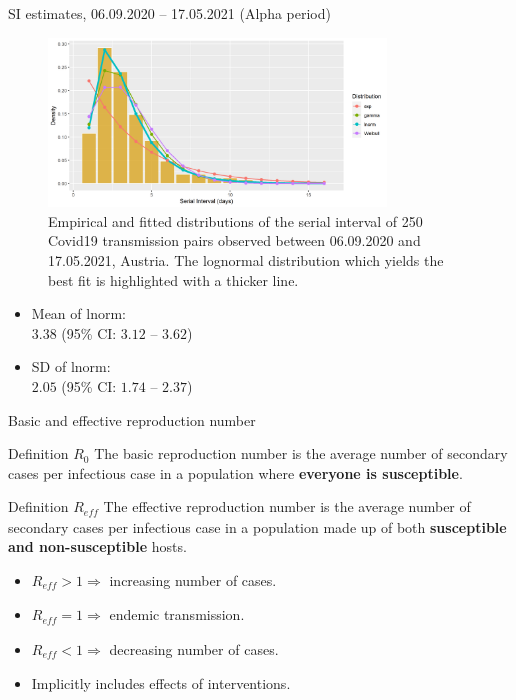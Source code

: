 \documentclass[
  ignorenonframetext,
  aspectratio=169,
]{beamer}
\newcommand{\mli}[1]{\mathit{#1}}%
\begin{document}
\begin{frame}{SI estimates, 06.09.2020 -- 17.05.2021 (Alpha period)}
\protect\hypertarget{si-estimates-06.09.2020-17.05.2021-alpha-period}{}
\begin{minipage} {.70\textwidth}
\begin{figure}
  \centering
  \includegraphics[width=0.8\textwidth,keepaspectratio]{img/fig2_fits_p2_2023-05-12.png}
  \caption{Empirical and fitted distributions of the serial interval of 250 Covid19 transmission pairs observed between 06.09.2020 and 17.05.2021, Austria. The lognormal  distribution which yields the best fit is highlighted with a thicker line.}
\end{figure}

\end{minipage}
\begin{minipage} {.25\textwidth}
\begin{itemize}
\item Mean of lnorm: \\ $3.38$ (95\% CI: $3.12$ -- $3.62$)
\item SD of lnorm: \\ $2.05$ (95\% CI: $1.74$ -- $2.37$)
\end{itemize}
\end{minipage}
\end{frame}

\begin{frame}{Basic and effective reproduction number}
\protect\hypertarget{basic-and-effective-reproduction-number}{}
\begin{block}{Definition $R_0$}
The basic reproduction number is the average number of secondary cases per infectious case in a population where \textbf{everyone is susceptible}. %
\end{block}
\begin{block}{Definition $R_\mli{eff}$}
The effective reproduction number is the average number of secondary cases per infectious case in a population made up of both \textbf{susceptible and non-susceptible} hosts. %
\end{block}
\pause
\begin{itemize}
\item $R_\mli{eff} > 1 \Rightarrow$ increasing number of cases.
\item $R_\mli{eff} = 1 \Rightarrow$ endemic transmission.
\item $R_\mli{eff} < 1 \Rightarrow$ decreasing number of cases.
\item Implicitly includes effects of interventions.
\end{itemize}
\end{frame}
\end{document}
